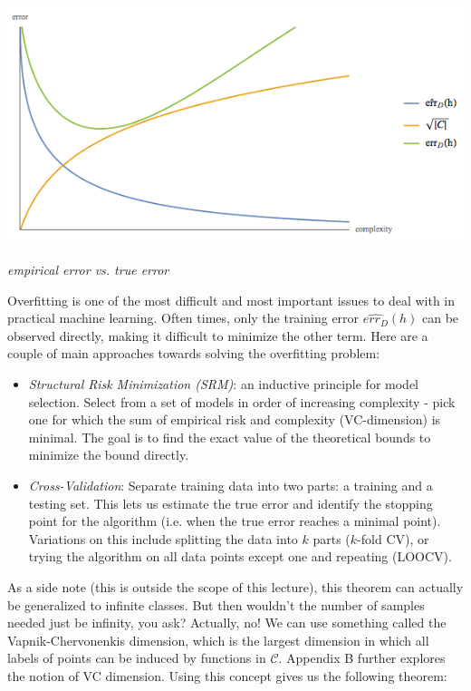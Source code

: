 \documentclass{article}
\begin{document}
\begin{center}
\includegraphics[width=\textwidth*6/8]{overfitting.png}

\emph{empirical error vs. true error}
\end{center}

Overfitting is one of the most difficult and most important issues to
deal with in practical machine learning. Often times, only the training
error $\hat{err_D}(h)$ can be observed directly, making it difficult to
minimize the other term. Here are a couple of main approaches towards
solving the overfitting problem:

\begin{itemize}
    \item \emph{Structural Risk Minimization (SRM)}: an inductive
    principle for model selection. Select from a set of models in order
    of increasing complexity - pick one for which the sum of empirical
    risk and complexity (VC-dimension) is minimal. The goal is to find
    the exact value of the theoretical bounds to minimize the bound
    directly.
    \item \emph{Cross-Validation}: Separate training data into two
    parts: a training and a testing set. This lets us estimate the true
    error and identify the stopping point for the algorithm (i.e. when
    the true error reaches a minimal point). Variations on this include
    splitting the data into $k$ parts ($k$-fold CV), or trying the
    algorithm on all data points except one and repeating (LOOCV).
\end{itemize}

As a side note (this is outside the scope of this lecture),
this theorem can actually be generalized to
infinite classes. But then wouldn't the number of samples
needed just be infinity, you ask? Actually, no! We can use
something called the Vapnik-Chervonenkis dimension, which
is the largest dimension in which all labels of points can
be induced by functions in $\mathcal{C}$. Appendix B further explores
the notion of VC dimension. Using this concept gives
us the following theorem:\\
\end{document}
